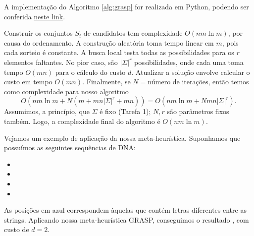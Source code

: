 A implementação do Algoritmo \ref{alg:grasp} for realizada em Python, podendo ser conferida \href{https://github.com/lucasresck/data-structures-algorithms/blob/main/intractable_problems/scripts/closest_string_grasp.py}{neste link}.

Construir os conjuntos $S_i$ de candidatos tem complexidade $O(nm\ln m)$, por causa do ordenamento. A construção aleatória toma tempo linear em $m$, pois cada sorteio é constante. A busca local testa todas as possibilidades para os $r$ elementos faltantes. No pior caso, são $|\Sigma|^r$ possibilidades, onde cada uma toma tempo $O(mn)$ para o cálculo do custo $d$. Atualizar a solução envolve calcular o custo em tempo $O(mn)$. Finalmente, se $N = \text{número de iterações}$, então temos como complexidade para nosso algoritmo
\[O(nm\ln m + N(m + mn|\Sigma|^r + mn)) = O(nm\ln m + Nmn|\Sigma|^r).\]
Assumimos, a princípio, que $\Sigma$ é fixo (Tarefa 1); $N, r$ são parâmetros fixos também. Logo, a complexidade final do algoritmo é $O(nm\ln m)$.

Vejamos um exemplo de aplicação da nossa meta-heurística. Suponhamos que possuímos as seguintes sequências de DNA:
\begin{itemize}
    \item {}\fbox{\color{blue}{T}}\fbox{\color{blue}{A}}\fbox{\color{blue}{G}}\fbox{\color{blue}{T}}
    \item {}\fbox{\color{blue}{C}}\fbox{\color{blue}{T}}\fbox{\color{blue}{A}}\fbox{\color{blue}{C}}
    \item {}\fbox{\color{blue}{C}}\fbox{\color{blue}{A}}\fbox{\color{blue}{G}}\fbox{\color{blue}{T}}
    \item {}\fbox{\color{blue}{T}}\fbox{\color{blue}{A}}\fbox{\color{blue}{G}}\fbox{\color{blue}{T}}
\end{itemize}
As posições em azul correspondem àquelas que contém letras diferentes entre as strings. Aplicando nossa meta-heurística GRASP, conseguimos o resultado \fbox{\color{blue}{C}}\fbox{\color{blue}{A}}\fbox{\color{blue}{G}}\fbox{\color{blue}{C}}, com custo de $d=2$. 
